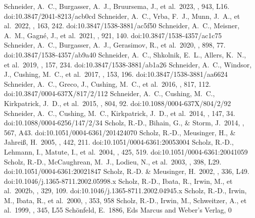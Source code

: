 \documentclass[twocolumn,tighten,twocolappendix]{aastex631}
\begin{document}
\begin{thebibliography}{}
 Schneider, A.~C., Burgasser, A.~J., Bruursema, J., et al.\ 2023, \apjl, 943, L16. doi:10.3847/2041-8213/acb0cd
 Schneider, A.~C., Vrba, F.~J., Munn, J.~A., et al.\ 2022, \aj, 163, 242. doi:10.3847/1538-3881/ac5f50
 Schneider, A.~C., Meisner, A.~M., Gagn{\'e}, J., et al.\ 2021, \apj, 921, 140. doi:10.3847/1538-4357/ac1c75
 Schneider, A.~C., Burgasser, A.~J., Gerasimov, R., et al.\ 2020, \apj, 898, 77. doi:10.3847/1538-4357/ab9a40
 Schneider, A.~C., Shkolnik, E.~L., Allers, K.~N., et al.\ 2019, \aj, 157, 234. doi:10.3847/1538-3881/ab1a26
 Schneider, A.~C., Windsor, J., Cushing, M.~C., et al.\ 2017, \aj, 153, 196. doi:10.3847/1538-3881/aa6624
 Schneider, A.~C., Greco, J., Cushing, M.~C., et al.\ 2016, \apj, 817, 112. doi:10.3847/0004-637X/817/2/112
 Schneider, A.~C., Cushing, M.~C., Kirkpatrick, J.~D., et al.\ 2015, \apj, 804, 92. doi:10.1088/0004-637X/804/2/92
 Schneider, A.~C., Cushing, M.~C., Kirkpatrick, J.~D., et al.\ 2014, \aj, 147, 34. doi:10.1088/0004-6256/147/2/34
 Scholz, R.-D., Bihain, G., \& Storm, J.\ 2014, \aap, 567, A43. doi:10.1051/0004-6361/201424070
 Scholz, R.-D., Meusinger, H., \& Jahrei{\ss}, H.\ 2005, \aap, 442, 211. doi:10.1051/0004-6361:20053004
 Scholz, R.-D., Lehmann, I., Matute, I., et al.\ 2004, \aap, 425, 519. doi:10.1051/0004-6361:20041059
 Scholz, R.-D., McCaughrean, M.~J., Lodieu, N., et al.\ 2003, \aap, 398, L29. doi:10.1051/0004-6361:20021847
 Scholz, R.-D. \& Meusinger, H.\ 2002, \mnras, 336, L49. doi:10.1046/j.1365-8711.2002.05998.x
 Scholz, R.-D., Ibata, R., Irwin, M., et al.\ 2002b, \mnras, 329, 109. doi:10.1046/j.1365-8711.2002.04945.x
 Scholz, R.-D., Irwin, M., Ibata, R., et al.\ 2000, \aap, 353, 958
 Scholz, R.-D., Irwin, M., Schweitzer, A., et al.\ 1999, \aap, 345, L55
 Sch{\"o}nfeld, E.\ 1886, Eds Marcus and Weber's Verlag, 0

\end{thebibliography}
\end{document}
